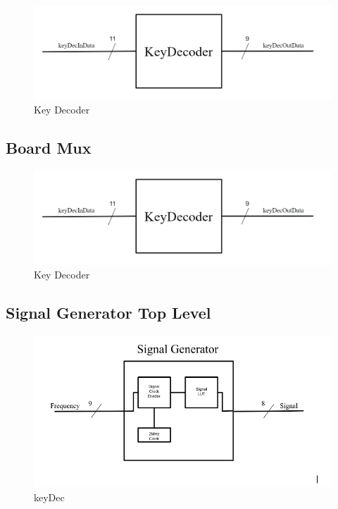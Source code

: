 \documentclass[a4paper]{article}
\begin{document}
\begin{figure}[h]
    \includegraphics[width=6 in]{./Images/DiagramsYang/keyDec.png}
    \caption{Key Decoder}
    \label{fig:10}
\end{figure}


\subsection{Board Mux}

\begin{figure}[h]
    \includegraphics[width=6 in]{./Images/DiagramsYang/keyDec.png}
    \caption{Key Decoder}
    \label{fig:11}
\end{figure}


\subsection{Signal Generator Top Level}

\begin{figure}[h]
    \includegraphics[width=6 in]{./Images/chasePictures/sigTopMod.png}
    \caption{keyDec}
    \label{fig:12}
\end{figure}
\end{document}
